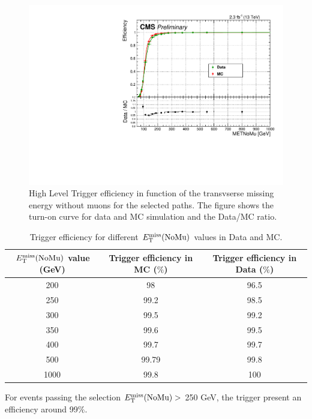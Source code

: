 \begin{figure}[!ht]
\begin{center}
  \includegraphics[width=350pt]{figures/trigger/trigeffOct23.pdf}
\end{center}
\caption{High Level Trigger efficiency in function of the transvserse missing energy without muons for the selected paths. The figure shows the turn-on curve for data and MC simulation and the Data/MC ratio.}
\label{fig:TriggerEff1}
\end{figure}

\begin{table}[!ht]
\begin{center}
\caption{Trigger efficiency for different $E_{\mathrm{T}}^{\text{miss}}(\text{NoMu})$ values in Data and MC.}
\label{tab:effvalues}
\begin{tabular}{ccc} \hline
$E_{\mathrm{T}}^{\text{miss}}(\text{NoMu})$ value (GeV) & Trigger efficiency in MC ($\%$)  & Trigger efficiency in Data ($\%$)  \\ \hline
200  &  98 & 96.5 \\
250  &  99.2  & 98.5\\
300  &  99.5 &  99.2 \\
350  &  99.6 &  99.5 \\
400  &  99.7 &  99.7 \\
500  &  99.79 & 99.8   \\
1000  &  99.8 & 100  \\ \hline
\end{tabular}
\end{center}
\end{table}

For events passing the selection $E_{\mathrm{T}}^{\text{miss}}(\text{NoMu}) >$ 250 GeV, the trigger present an efficiency around  99$\%$. 

